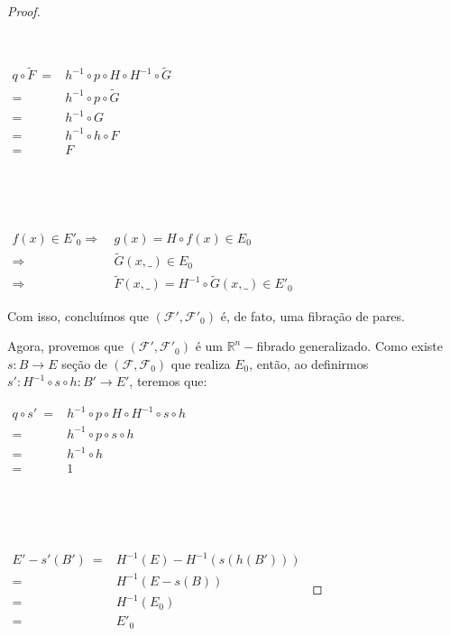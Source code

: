 \documentclass[12pt,oneside]{book} %
\newcommand{\R}{\mathbb{R}}
\newcommand{\wt}{\widetilde}
\begin{document}
\begin{proof}
	\
	
	\
	
	$\begin{array}{rl}
		q\circ \wt{F} \ = & h^{-1}\circ p\circ H\circ H^{-1}\circ \wt{G} \\
		= & h^{-1}\circ p\circ \wt{G} \\
		= & h^{-1}\circ G \\
		= & h^{-1}\circ h\circ F \\
		= & F
	\end{array}$
	
	\
	
	\
	
	$\begin{array}{rl}
		f(x)\in E'_{0} \Longrightarrow \ & g(x)=H\circ f(x)\in E_{0} \\
		\Longrightarrow & \wt{G}(x,\_)\in E_{0} \\
		\Longrightarrow & \wt{F}(x,\_)=H^{-1}\circ \wt{G}(x,\_)\in E'_{0}
	\end{array}$ \newline 
	
	\par Com isso, concluímos que $(\mathcal{F'},\mathcal{F'}_{0})$ é, de fato, uma fibração de pares.
	
	\par Agora, provemos que $(\mathcal{F'},\mathcal{F'}_{0})$ é um $\R^{n}-$fibrado generalizado. Como existe $s:B\to E$ seção de $(\mathcal{F},\mathcal{F}_{0})$ que realiza $E_{0}$, então, ao definirmos $s':H^{-1}\circ s\circ h:B'\to E'$, teremos que: \newline 
	
	$\begin{array}{rl}
		q\circ s' \ = & h^{-1}\circ p\circ H\circ H^{-1}\circ s\circ h \\
		= & h^{-1}\circ p\circ s\circ h \\
		= & h^{-1}\circ h \\
		= & 1
	\end{array}$
	
	\
	
	\
	
	$\begin{array}{rl}
		E'-s'(B') \ = & H^{-1}(E)-H^{-1}(s(h(B'))) \\
		= & H^{-1}(E-s(B)) \\
		= & H^{-1}(E_{0}) \\
		= & E'_{0}
	\end{array}$ \newline
	

\end{proof}
\end{document}
